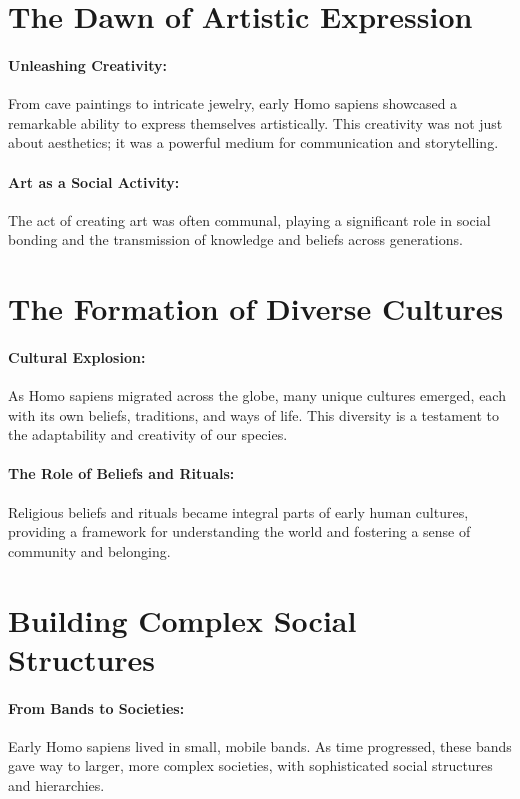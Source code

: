 \documentclass[a4paper,12pt]{book}
\begin{document}
\section*{The Dawn of Artistic Expression}

\paragraph{Unleashing Creativity:}
From cave paintings to intricate jewelry, early Homo sapiens showcased a remarkable ability to express themselves artistically. This creativity was not just about aesthetics; it was a powerful medium for communication and storytelling.

\paragraph{Art as a Social Activity:}
The act of creating art was often communal, playing a significant role in social bonding and the transmission of knowledge and beliefs across generations.

\section*{The Formation of Diverse Cultures}

\paragraph{Cultural Explosion:}
As Homo sapiens migrated across the globe, many unique cultures emerged, each with its own beliefs, traditions, and ways of life. This diversity is a testament to the adaptability and creativity of our species.

\paragraph{The Role of Beliefs and Rituals:}
Religious beliefs and rituals became integral parts of early human cultures, providing a framework for understanding the world and fostering a sense of community and belonging.

\section*{Building Complex Social Structures}

\paragraph{From Bands to Societies:}
Early Homo sapiens lived in small, mobile bands. As time progressed, these bands gave way to larger, more complex societies, with sophisticated social structures and hierarchies.
\end{document}
